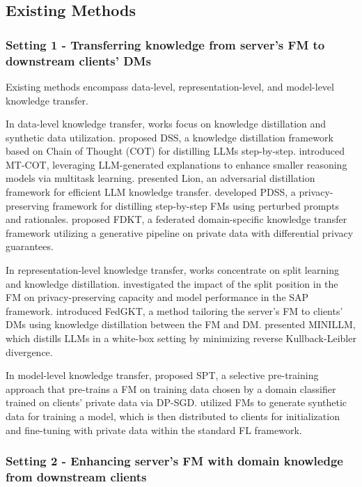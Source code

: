 \subsection{Existing Methods}
\subsubsection{Setting 1 - Transferring knowledge from server's FM to downstream clients' DMs}

Existing methods encompass data-level, representation-level, and model-level knowledge transfer.

In data-level knowledge transfer, works focus on knowledge distillation and synthetic data utilization. \citet{hsieh2023distilling} proposed DSS, a knowledge distillation framework based on Chain of Thought (COT) for distilling LLMs step-by-step. \citet{li2022explanations} introduced MT-COT, leveraging LLM-generated explanations to enhance smaller reasoning models via multitask learning. \citet{jiang2023lion} presented Lion, an adversarial distillation framework for efficient LLM knowledge transfer. \citet{fan2024pdss} developed PDSS, a privacy-preserving framework for distilling step-by-step FMs using perturbed prompts and rationales. \citet{li2024federated} proposed FDKT, a federated domain-specific knowledge transfer framework utilizing a generative pipeline on private data with differential privacy guarantees.

In representation-level knowledge transfer, works concentrate on split learning and knowledge distillation. \citet{shen2023split} investigated the impact of the split position in the FM on privacy-preserving capacity and model performance in the SAP framework. \citet{he2019model} introduced FedGKT, a method tailoring the server's FM to clients' DMs using knowledge distillation between the FM and DM. \citet{gu2024minillm} presented MINILLM, which distills LLMs in a white-box setting by minimizing reverse Kullback-Leibler divergence.

In model-level knowledge transfer, \citet{yu2023selective} proposed SPT, a selective pre-training approach that pre-trains a FM on training data chosen by a domain classifier trained on clients' private data via DP-SGD. \citet{zhang2023gpt} utilized FMs to generate synthetic data for training a model, which is then distributed to clients for initialization and fine-tuning with private data within the standard FL framework.

\subsubsection{Setting 2 - Enhancing  server's FM with domain knowledge from downstream clients}

